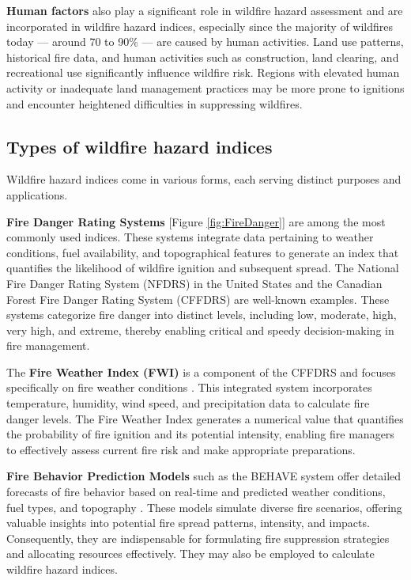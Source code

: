 \documentclass[
  12 pt,
]{Nemilov}
\begin{document}
\textbf{Human factors} also play a significant role in wildfire hazard assessment and are incorporated in wildfire hazard indices, especially since the majority of wildfires today --- around 70 to 90\% \citep{robinne2021impacts} --- are caused by human activities. Land use patterns, historical fire data, and human activities such as construction, land clearing, and recreational use significantly influence wildfire risk. Regions with elevated human activity or inadequate land management practices may be more prone to ignitions and encounter heightened difficulties in suppressing wildfires.

\subsection{Types of wildfire hazard indices}\label{types-of-wildfire-hazard-indices}

Wildfire hazard indices come in various forms, each serving distinct purposes and applications.

\textbf{Fire Danger Rating Systems} {[}Figure \ref{fig:FireDanger}{]} are among the most commonly used indices. These systems integrate data pertaining to weather conditions, fuel availability, and topographical features to generate an index that quantifies the likelihood of wildfire ignition and subsequent spread. The National Fire Danger Rating System (NFDRS) \citep{deeming1972national} in the United States and the Canadian Forest Fire Danger Rating System (CFFDRS) \citep{stocks1989canadian, van1974structure} are well-known examples. These systems categorize fire danger into distinct levels, including low, moderate, high, very high, and extreme, thereby enabling critical and speedy decision-making in fire management.

The \textbf{Fire Weather Index (FWI)} is a component of the CFFDRS and focuses specifically on fire weather conditions \citep{van1974structure}. This integrated system incorporates temperature, humidity, wind speed, and precipitation data to calculate fire danger levels. The Fire Weather Index generates a numerical value that quantifies the probability of fire ignition and its potential intensity, enabling fire managers to effectively assess current fire risk and make appropriate preparations.

\textbf{Fire Behavior Prediction Models} such as the BEHAVE system offer detailed forecasts of fire behavior based on real-time and predicted weather conditions, fuel types, and topography \citep{burgan1984behave}. These models simulate diverse fire scenarios, offering valuable insights into potential fire spread patterns, intensity, and impacts. Consequently, they are indispensable for formulating fire suppression strategies and allocating resources effectively. They may also be employed to calculate wildfire hazard indices.
\end{document}
